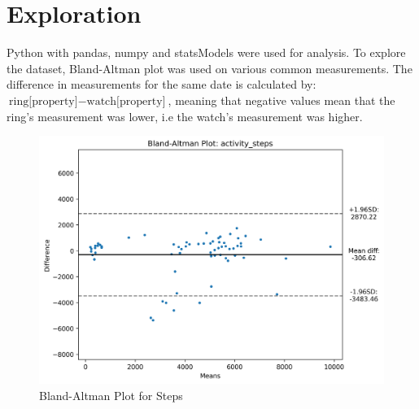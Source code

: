 \section{Exploration}
Python with pandas, numpy and statsModels were used for analysis. To explore the dataset, Bland-Altman plot was used on various common measurements. The difference in measurements for the same date is calculated by: $\text{ring[property]} - \text{watch[property]}$, meaning that negative values mean that the ring's measurement was lower, i.e the watch's measurement was higher.
\begin{figure}
    
    \centering
    \includegraphics[width=\textwidth,keepaspectratio]{../images/bland_altman_steps.png}
    \caption{Bland-Altman Plot for Steps}
    \label{fig:blandAltmanSteps}
    
\end{figure}

